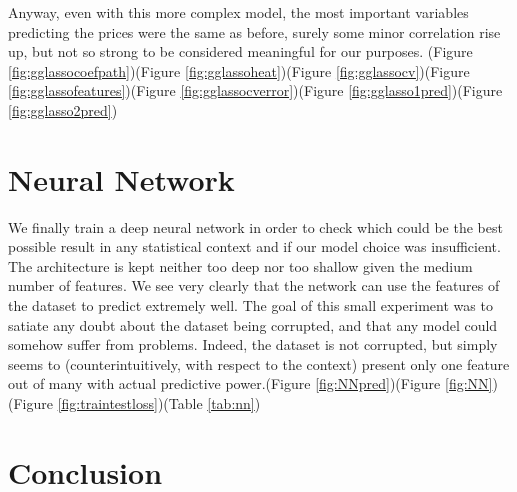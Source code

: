 \documentclass[a4paper, 9pt]{article}
\begin{document}
\begin{multicols}{2}
Anyway, even with this more complex model, the most important variables predicting the prices were the same as before, surely some minor correlation rise up, but not so strong to be considered meaningful for our purposes. (Figure \ref{fig:gglassocoefpath})(Figure \ref{fig:gglassoheat})(Figure \ref{fig:gglassocv})(Figure \ref{fig:gglassofeatures})(Figure \ref{fig:gglassocverror})(Figure \ref{fig:gglasso1pred})(Figure \ref{fig:gglasso2pred})

\section{Neural Network} \vspace{-7pt}
We finally train a deep neural network in order to check which could be the best possible result in any statistical context and if our model choice was insufficient.\\
The architecture is kept neither too deep nor too shallow given the medium number of features. We see very clearly that the network can use the features of the dataset to predict extremely well. The goal of this small experiment was to satiate any doubt about the dataset being corrupted, and that any model could somehow suffer from problems. Indeed, the dataset is not corrupted, but simply seems to (counterintuitively, with respect to the context) present only one feature out of many with actual predictive power.(Figure \ref{fig:NNpred})(Figure \ref{fig:NN})(Figure \ref{fig:traintestloss})(Table \ref{tab:nn})

\section{Conclusion} \vspace{-7pt}
\noindent

\end{multicols}


\pagebreak
\appendix
\end{document}
